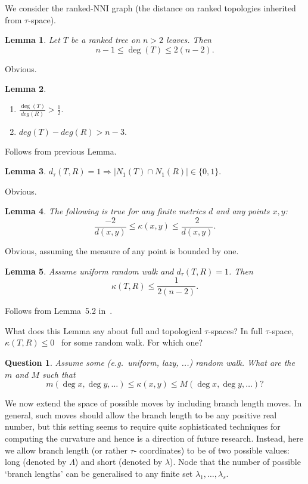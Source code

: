 \documentclass[12pt]{article}
\newtheorem{lemma}{Lemma}
\newtheorem{question}{Question}
\begin{document}


We consider the ranked-NNI graph (the distance on ranked topologies inherited from 
$\tau$-space). 

\begin{lemma}
Let $T$ be a ranked tree on $n>2$ leaves. Then \[n-1\leq \deg(T)\leq2(n-2).\] 
\end{lemma}

\proof
Obvious. 
\endproof

\begin{lemma}
\begin{enumerate}[(1)]
\item $\frac{\deg(T)}{deg(R)}>\frac12.$
\item $deg(T)-deg(R)> n-3.$
\end{enumerate}
\end{lemma}

\proof
Follows from previous Lemma. 
\endproof

\begin{lemma}
$d_{\tau}(T,R) = 1 \Rightarrow |N_1(T)\cap N_1(R)|\in\{0,1\}.$
\end{lemma}

\proof
Obvious.
\endproof

\begin{lemma}
The following is true for any finite metrics $d$ and any points $x,y$:
\[
\frac{-2}{d(x,y)} \leq \kappa(x,y) \leq \frac{2}{d(x,y)}.
\]
\end{lemma}

\proof
Obvious, assuming the measure of any point is bounded by one. 
\endproof


\begin{lemma}
Assume uniform random walk and $d_\tau(T,R) = 1$. Then \[\kappa(T,R) \leq 
\frac{1}{2(n-2)}.\]
\end{lemma}

\proof
Follows from Lemma~5.2 in~\cite{WhiddenMatsen}. 
\endproof

What does this Lemma say about full and topological $\tau$-spaces? In full $\tau$-space,
$\kappa(T,R) \leq 0$~\cite{GD} for some random walk. For which one? 

\begin{question}
Assume some (e.g.\ uniform, lazy, ...) random walk. What are the $m$ and $M$ 
such that 
\[
m(\deg x,\deg y, \ldots) \leq \kappa(x,y) \leq M(\deg x, \deg y, \ldots)? 
\]
\end{question}

We now extend the space of possible moves by including branch length moves. In general,
such moves should allow the branch length to be any positive real number, but this setting
seems to require quite sophisticated techniques for computing the curvature and hence is 
a direction of future research. Instead, here we allow branch length (or rather $\tau$-
coordinates) to be of two possible values: long (denoted by $\Lambda$) and short (denoted 
by $\lambda$). Node that the number of possible `branch lengths' can be generalised 
to any finite set $\lambda_1,\ldots,\lambda_s$.
\end{document}
